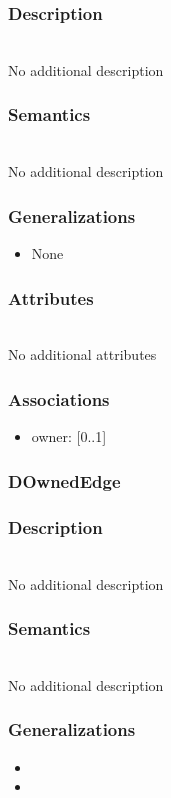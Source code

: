 \documentclass{article}
\begin{document}
\subsubsection*{Description} ~\\ No additional description
\subsubsection*{Semantics} ~\\ No additional description
\subsubsection*{Generalizations}
\begin{itemize}
\item None
\end{itemize}
\subsubsection*{Attributes} ~\\ No additional attributes
\subsubsection*{Associations}
\begin{itemize}
\item owner:  [0..1] 
\end{itemize}
\subsubsection{DOwnedEdge}\label{DOwnedEdge} 
\subsubsection*{Description} ~\\ No additional description
\subsubsection*{Semantics} ~\\ No additional description
\subsubsection*{Generalizations}
\begin{itemize}
\item {}
\item {}
\end{itemize}
\end{document}

